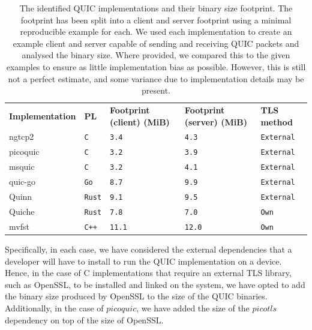 \begin{table}[ht]
    \caption{The identified QUIC implementations and their binary size footprint. The footprint has been split into a client and server footprint using a minimal reproducible example for each. We used each implementation to create an example client and server capable of sending and receiving QUIC packets and analysed the binary size. Where provided, we compared this to the given examples to ensure as little implementation bias as possible. However, this is still not a perfect estimate, and some variance due to implementation details may be present.}\label{tab:quics}
    \begin{tabular}{@{}lllll@{}}
        \toprule
        \textbf{Implementation} & \textbf{PL}   & \textbf{Footprint (client) (MiB)} & \textbf{Footprint (server) (MiB)} & \textbf{TLS method} \\
        ngtcp2                  & \texttt{C}    & \texttt{3.4}                      & \texttt{4.3}                      & \texttt{External}   \\
        picoquic                & \texttt{C}    & \texttt{3.2}                      & \texttt{3.9}                      & \texttt{External}   \\
        msquic                  & \texttt{C}    & \texttt{3.2}                      & \texttt{4.1}                      & \texttt{External}   \\
        quic-go                 & \texttt{Go}   & \texttt{8.7}                      & \texttt{9.9}                      & \texttt{External}   \\
        Quinn                   & \texttt{Rust} & \texttt{9.1}                      & \texttt{9.5}                      & \texttt{External}   \\
        Quiche                  & \texttt{Rust} & \texttt{7.8}                      & \texttt{7.0}                      & \texttt{Own}        \\
        mvfst                   & \texttt{C++}  & \texttt{11.1}                     & \texttt{12.0}                     & \texttt{Own}        \\
        \bottomrule
    \end{tabular}
\end{table}

Specifically, in each case, we have considered the external dependencies that a developer will have to install to run the QUIC implementation on a device.
Hence, in the case of C implementations that require an external TLS library, such as OpenSSL, to be installed and linked on the system, we have opted to add the binary size produced by OpenSSL to the size of the QUIC binaries.
Additionally, in the case of $picoquic$, we have added the size of the $picotls$ dependency on top of the size of OpenSSL.

